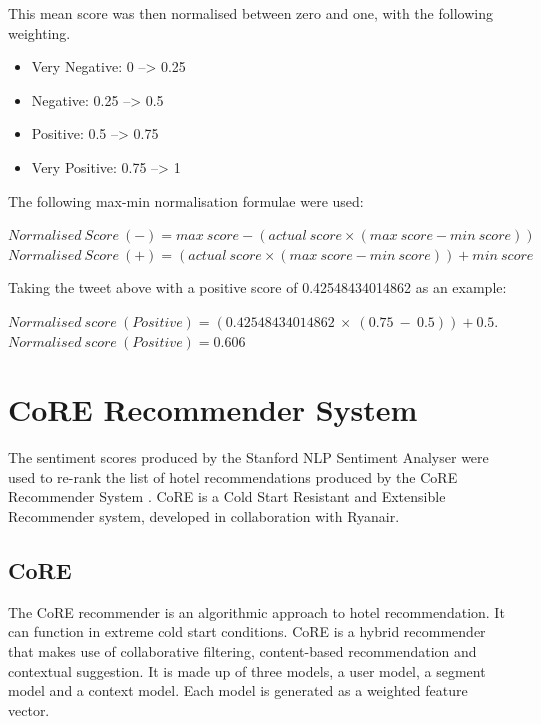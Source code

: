 This mean score was then normalised between zero and one, with the following weighting.
\begin{itemize}
    \item Very Negative: 0 --> 0.25
    \item Negative: 0.25 --> 0.5
    \item Positive: 0.5 --> 0.75
    \item Very Positive: 0.75 --> 1
\end{itemize}

The following max-min normalisation formulae were used:

\begin{tcolorbox}[title=Normalisation]
$Normalised\ Score\ (-) = max\ score-(actual\ score \times (max\ score - min\ score))$
$Normalised\ Score\ (+) = (actual\ score \times (max\ score - min\ score)) + min\ score$
\end{tcolorbox}

Taking the tweet above with a positive score of 0.42548434014862 as an example:
\begin{tcolorbox}[title=Example]
$Normalised\ score\ (Positive) = (0.42548434014862\ \times\ (0.75\ -\ 0.5)) + 0.5.$
$Normalised\ score\ (Positive) = 0.606$
\end{tcolorbox}

\section{CoRE Recommender System}

The sentiment scores produced by the Stanford NLP Sentiment Analyser \cite{stanfordSentiment2013} were used to re-rank the list of hotel recommendations produced by the CoRE Recommender System \cite{core2019}. CoRE is a Cold Start Resistant and Extensible Recommender system, developed in collaboration with Ryanair. 

\subsection{CoRE}

The CoRE recommender is an algorithmic approach to hotel recommendation. It can function in extreme cold start conditions. CoRE is a hybrid recommender that makes use of collaborative filtering, content-based recommendation and contextual suggestion. It is made up of three models, a user model, a segment model and a context model. Each model is generated as a weighted feature vector.

